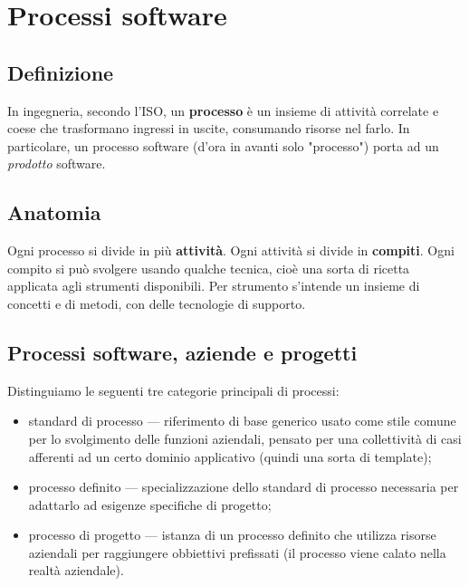 \documentclass[a4paper]{article}
\begin{document}
		
	\section{Processi software}


		
	\subsection{Definizione}

		
In ingegneria, secondo l'ISO, un \textbf{processo} è un insieme di attività correlate e coese che trasformano ingressi in uscite, consumando risorse nel farlo. In particolare, un processo software (d'ora in avanti solo "processo") porta ad un \emph{prodotto} software.

		
	\subsection{Anatomia}

		
Ogni processo si divide in più \textbf{attività}. Ogni attività si divide in \textbf{compiti}. Ogni compito si può svolgere usando qualche tecnica, cioè una sorta di ricetta applicata agli strumenti disponibili. Per strumento s'intende un insieme di concetti e di metodi, con delle tecnologie di supporto.

		
	\subsection{Processi software, aziende e progetti}

		
Distinguiamo le seguenti tre categorie principali di processi:
		
	\begin{itemize}
		
			
	\item standard di processo --- riferimento di base generico usato come stile comune per lo svolgimento delle funzioni aziendali, pensato per una collettività di casi afferenti ad un certo dominio applicativo (quindi una sorta di template); %

			
	\item processo definito --- specializzazione dello standard di processo necessaria per adattarlo ad esigenze specifiche di progetto;
			
	\item processo di progetto --- istanza di un processo definito che utilizza risorse aziendali per raggiungere obbiettivi prefissati (il processo viene calato nella realtà aziendale).
		
	\end{itemize}
\end{document}
